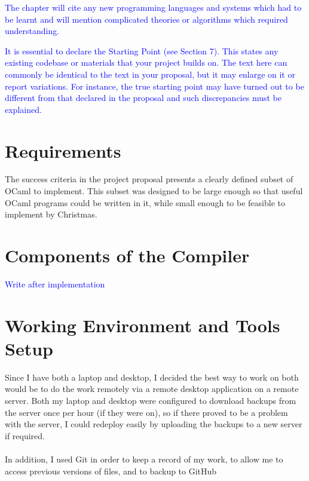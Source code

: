 \documentclass[12pt,twoside,notitlepage]{report}
\newcommand\note[1]{\textcolor{blue}{#1}}
\begin{document}
\note{The chapter will cite any new programming languages and systems which had to be learnt and will mention complicated theories or algorithms which required understanding.}

\note{It is essential to declare the Starting Point (see Section 7). This states any existing codebase or materials that your project builds on. The text here can commonly be identical to the text in your proposal, but it may enlarge on it or report variations. For instance, the true starting point may have turned out to be different from that declared in the proposal and such discrepancies must be explained. }

\section{Requirements}

The success criteria in the project proposal presents a clearly defined subset of OCaml to implement. This subset was designed to be large enough so that useful OCaml programs could be written in it, while small enough to be feasible to implement by Christmas.




\section{Components of the Compiler}
\note{Write after implementation}

\section{Working Environment and Tools Setup}
Since I have both a laptop and desktop, I decided the best way to work on both would be to do the work remotely via a remote desktop application on a remote server. Both my laptop and desktop were configured to download backups from the server once per hour (if they were on), so if there proved to be a problem with the server, I could redeploy easily by uploading the backups to a new server if required.
\\\\
In addition, I used Git in order to keep a record of my work, to allow me to access previous versions of files, and to backup to GitHub
\end{document}
